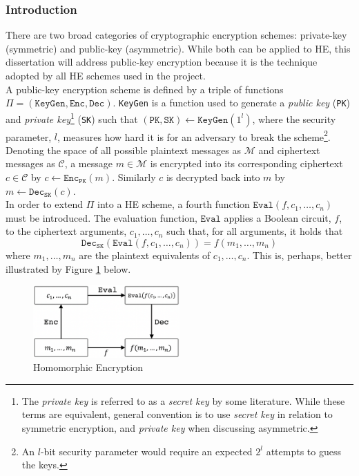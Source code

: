 \subsubsection{Introduction}
\indent \indent
There are two broad categories of cryptographic encryption schemes: private-key (symmetric) and public-key (asymmetric). While both can be applied to HE, this dissertation will address public-key encryption because it is the technique adopted by all HE schemes used in the project.
\smallskip \\ \indent
A public-key encryption scheme is defined by a triple of functions $\Pi = (\texttt{KeyGen}, \texttt{Enc}, \texttt{Dec})$. \texttt{KeyGen} is a function used to generate a \textit{public key} (\texttt{PK}) and \textit{private key}\footnote{The \textit{private key} is referred to as a \textit{secret key} by some literature. While these terms are equivalent, general convention is to use \textit{secret key} in relation to symmetric encryption, and \textit{private key} when discussing asymmetric.} (\texttt{SK}) such that $(\texttt{PK}, \texttt{SK}) \leftarrow \texttt{KeyGen}(1^l)$, where the security parameter, $l$, measures how hard it is for an adversary to break the scheme\footnote{An $l$-bit security parameter would require an expected $2^l$ attempts to guess the keys.}. Denoting the space of all possible plaintext messages as $\mathcal{M}$ and ciphertext messages as $\mathcal{C}$, a message $m \in \mathcal{M}$ is encrypted into its corresponding ciphertext $c \in \mathcal{C}$ by $c \leftarrow \texttt{Enc}_\texttt{PK}(m)$. Similarly $c$ is decrypted back into $m$ by $m \leftarrow \texttt{Dec}_\texttt{SK}(c)$.
\smallskip \\ \indent
In order to extend $\Pi$ into a HE scheme, a fourth function $\texttt{Eval}(f, c_1, \ldots, c_n)$ must be introduced. The evaluation function, $\texttt{Eval}$ applies a Boolean circuit, $f$, to the ciphertext arguments, $c_1, \ldots, c_n$ such that, for all arguments, it holds that
\begin{equation}
    \texttt{Dec}_\texttt{SK}(\texttt{Eval}(f, c_1, \ldots, c_n)) = f(m_1, \ldots, m_n)
\end{equation}
where $m_1, \ldots, m_n$ are the plaintext equivalents of $c_1, \ldots, c_n$. This is, perhaps, better illustrated by Figure \ref{fig:homomorphicEncryption} below.
\begin{figure}[ht]
    \centering
    \includegraphics[width=0.5\textwidth]{figures/homomorphicEncryption.png}
    \caption[Homomorphic Encryption]{Homomorphic Encryption}
    \label{fig:homomorphicEncryption}
\end{figure}
